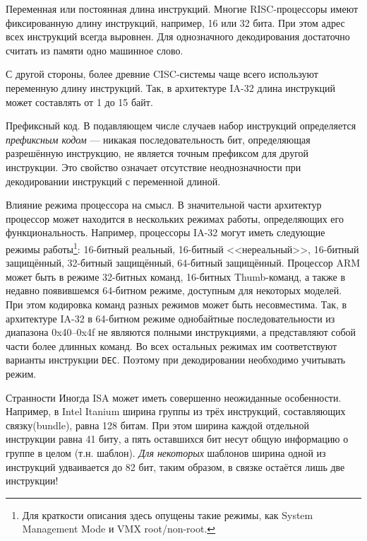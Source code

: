 \begin{description*}
    \item[Переменная или постоянная длина инструкций.] Многие RISC-процессоры имеют фиксированную длину инструкций, например, 16 или 32 бита. При этом адрес всех инструкций всегда выровнен. Для однозначного декодирования достаточно считать из памяти одно машинное слово.
    
    С другой стороны, более древние CISC-системы чаще всего используют переменную длину инструкций. Так, в архитектуре IA-32 длина инструкций может составлять от 1 до 15 байт. %
    \item[Префиксный код.] В подавляющем числе случаев набор инструкций определяется \textit{префиксным кодом} --- никакая последовательность бит, определяющая разрешённую инструкцию, не является точным префиксом для другой инструкции. Это свойство означает  отсутствие неоднозначности при декодировании инструкций с переменной длиной. 
    \item[Влияние режима процессора на смысл.] В значительной части архитектур процессор может находится в нескольких режимах работы, определяющих его функциональность. Например, процессоры IA-32 могут иметь следующие режимы работы\footnote{Для краткости описания здесь опущены такие режимы, как System Management Mode и VMX root/non-root.}: 16-битный реальный, 16-битный <<нереальный>>,  16-битный защищённый, 32-битный защищённый, 64-битный защищённый. Процессор ARM может быть в режиме 32-битных команд, 16-битных Thumb-команд, а также в недавно появившемся 64-битном режиме, доступным для некоторых моделей. При этом кодировка команд разных режимов может быть несовместима. Так, в архитектуре IA-32 в 64-битном режиме однобайтные последовательности из диапазона 0x40--0x4f не являются полными инструкциями, а представляют собой части более длинных команд. Во всех остальных режимах им соответствуют варианты инструкции \texttt{DEC}. Поэтому при декодировании необходимо учитывать режим.
    
    \item[Странности] Иногда ISA может иметь совершенно неожиданные особенности. Например, в Intel Itanium ширина группы из трёх инструкций, составляющих связку(\abbr bundle), равна 128 битам. При этом ширина каждой отдельной инструкции равна 41 биту, а пять оставшихся бит несут общую информацию о группе в целом (т.н. шаблон). \textit{Для некоторых} шаблонов ширина одной из инструкций удваивается до 82 бит, таким образом, в связке остаётся лишь две инструкции!
\end{description*}


